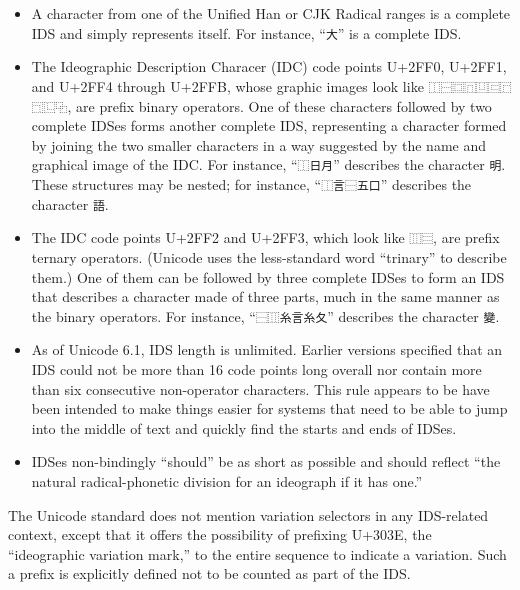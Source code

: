 \documentclass[twocolumn]{report}
\begin{document}
\begin{itemize}

\item A character from one of the Unified Han or CJK Radical ranges is a
complete IDS and simply represents itself.  For instance, ``\texttt{大}'' is
a complete IDS.

\item The Ideographic Description Characer (IDC) code points U+2FF0, U+2FF1,
and U+2FF4 through U+2FFB, whose graphic images look like
\texttt{⿰⿱⿴⿵⿶⿷⿸⿹⿺⿻}, are prefix binary operators.
One of these characters followed by two complete IDSes
forms another complete IDS, representing a character formed by joining the
two smaller characters in a way suggested by the name and graphical image
of the IDC.  For instance, ``\texttt{⿰日月}'' describes the
character \texttt{明}.  These structures may be nested; for instance,
``\texttt{⿰言⿱五口}'' describes the character \texttt{語}.

\item The IDC code points U+2FF2 and U+2FF3, which look like \texttt{⿲⿳},
are prefix ternary operators. (Unicode uses the less-standard word
``trinary'' to describe them.) One of them can be followed by three complete
IDSes to form an IDS that describes a character made of three parts, much in
the same manner as the binary operators.  For instance,
``\texttt{⿱⿲糸言糸夂}'' describes the character \texttt{變}.

\item As of Unicode 6.1, IDS length is unlimited.  Earlier versions
specified that an IDS could not be more than 16 code points long overall
nor contain more than six consecutive non-operator characters.
This rule appears to be have been intended to make things easier for systems
that need to be able to jump into the middle of text and quickly find the
starts and ends of IDSes.

\item IDSes non-bindingly ``should'' be as short as possible and should
reflect ``the natural radical-phonetic division for an ideograph if it has
one.''
\end{itemize}

The Unicode standard does not mention variation selectors in any IDS-related
context, except that it offers the possibility of prefixing U+303E, the
``ideographic variation mark,'' to the entire sequence to indicate a
variation.  Such a prefix is explicitly defined not to be counted as part of
the IDS.
\end{document}
